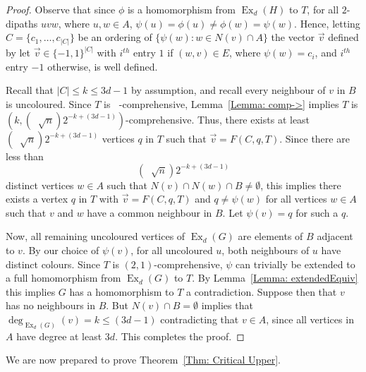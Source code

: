 \documentclass[11pt]{article}
\theoremstyle{definition}
\DeclareMathOperator{\ex}{\text{Ex}}
\DeclareMathOperator{\coe}{6\Big(1+\frac{9d^2}{4}\Big)^{\frac{1}{2}}d}
\DeclareMathOperator{\bound}{\Big( 3d-1, \coe\sqrt{n}\Big)}
\begin{document}
\begin{proof}
    Observe that since $\phi$ is a homomorphism from $\ex_d(H)$ to $T$,
    for all $2$-dipaths $uvw$, where $u,w\in A$, $\psi(u)=\phi(u)\neq \phi(w)=\psi(w)$. Hence, 
    letting $C = \{c_1,\dots, c_{|C|}\}$ be an ordering of $\{\psi(w): w \in N(v)\cap A\}$ the vector $\vec{v}$ defined by let $\vec{v} \in \{-1,1\}^{|C|}$ with $i^{th}$ entry $1$ if $(w,v)\in E$, where $\psi(w) = c_i$, and $i^{th}$ entry $-1$ otherwise, is well defined.
    
    Recall that $|C|\leq k\leq 3d-1$ by assumption, and recall every neighbour of $v$ in $B$ is uncoloured.
    Since $T$ is $\bound$-comprehensive,
    Lemma~\ref{Lemma: comp->} implies $T$ is $(k,(\coe\sqrt{n}) 2^{-k+(3d-1)})$-comprehensive.
    Thus, there exists 
    at least $(\coe\sqrt{n})2^{-k+(3d-1)}$ vertices $q$ in $T$ such that $\vec{v} = F(C,q,T)$.
    Since there are less than  
    \[
    (\coe\sqrt{n})2^{-k+(3d-1)}
    \]
     distinct vertices $w\in A$ such that $N(v)\cap N(w)\cap B \neq \emptyset$,
    this implies there exists a vertex $q$ in $T$ with 
    $\vec{v} = F(C,q,T)$
    and $q \neq \psi(w)$ for all vertices $w \in A$ such that $v$ and $w$ have a common neighbour in $B$.
    Let $\psi(v)=q$ for such a $q$.
    
    Now, all remaining uncoloured vertices of $\ex_d(G)$ are elements of $B$ adjacent to $v$.
    By our choice of $\psi(v)$, for all uncoloured $u$, both neighbours of $u$ have distinct colours.
    Since $T$ is $(2,1)$-comprehensive, $\psi$ can trivially be extended to a full homomorphism from $\ex_d(G)$ to $T$.
    By Lemma~\ref{Lemma: extendedEquiv} this implies $G$ has a homomorphism to $T$ a contradiction.
    Suppose then that $v$ has
    no neighbours in $B$.
    But $N(v)\cap B=\emptyset$ implies that $\deg_{\ex_d(G)}(v)=k\leq (3d-1)$ contradicting that $v \in A$, since all vertices in $A$ have degree at least $3d$.
    This completes the proof.
\end{proof}


We are now prepared to prove Theorem~\ref{Thm: Critical Upper}.
\end{document}
